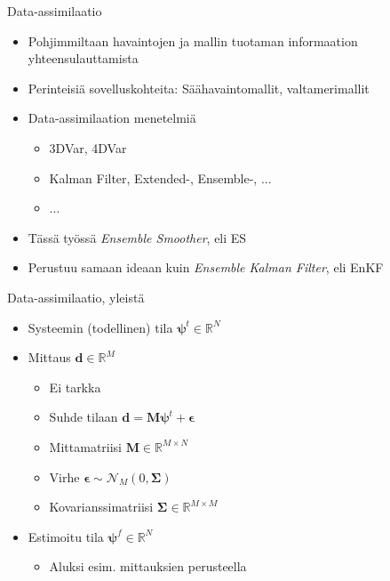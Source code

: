 \documentclass{beamer}
\begin{document}
\begin{frame}{Data-assimilaatio}

\begin{itemize}
\item Pohjimmiltaan havaintojen ja mallin tuotaman informaation yhteensulauttamista
\item Perinteisiä sovelluskohteita: Säähavaintomallit, valtamerimallit
\item Data-assimilaation menetelmiä
\begin{itemize}
\item 3DVar, 4DVar
\item Kalman Filter, Extended-, Ensemble-, ...
\item ...
\end{itemize}
\item Tässä työssä \emph{Ensemble Smoother}, eli ES
\item Perustuu samaan ideaan kuin \emph{Ensemble Kalman Filter}, eli EnKF
\end{itemize}

\end{frame}

\begin{frame}{Data-assimilaatio, yleistä}

\begin{itemize}
\item Systeemin (todellinen) tila $\boldsymbol{\psi}^t \in \mathbb{R}^N$
\item Mittaus $\boldsymbol{d} \in \mathbb{R}^M$
\begin{itemize}
\item Ei tarkka
\item Suhde tilaan $\boldsymbol{d} = \mathbf{M}\boldsymbol{\psi}^t+\boldsymbol{\epsilon}$
\item Mittamatriisi $\mathbf{M} \in \mathbb{R}^{M \times N}$
\item Virhe $\boldsymbol{\epsilon} \sim \mathcal{N}_M(0,\boldsymbol{\Sigma})$
\item Kovarianssimatriisi $\boldsymbol{\Sigma} \in \mathbb{R}^{M \times M}$
\end{itemize}
\item Estimoitu tila $\boldsymbol{\psi}^f \in \mathbb{R}^N$
\begin{itemize}
\item Aluksi esim. mittauksien perusteella
\end{itemize}
\end{itemize}

\end{frame}
\end{document}

